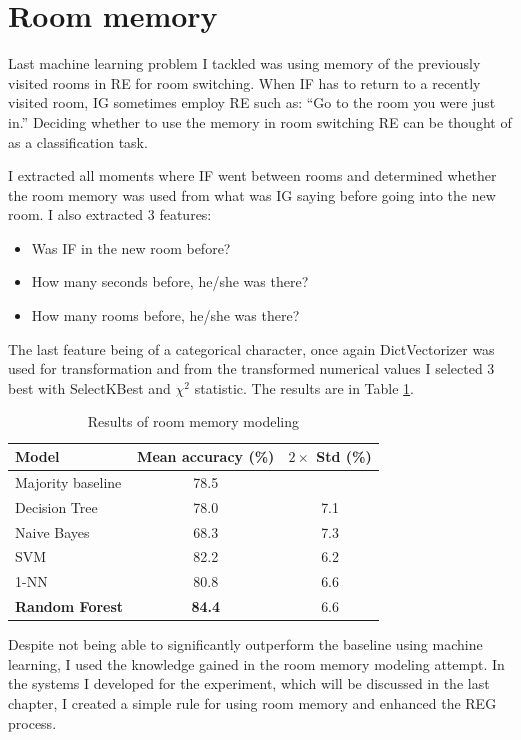 \section{Room memory}
Last machine learning problem I tackled was using memory of the previously visited rooms in RE for room switching. When IF has to return to a recently visited room, IG sometimes employ RE such as: ``Go to the room you were just in.'' Deciding whether to use the memory in room switching RE can be thought of as a classification task.

I extracted all moments where IF went between rooms and determined whether the room memory was used from what was IG saying before going into the new room. I also extracted 3 features:

\begin{itemize}
\item
Was IF in the new room before?
\item
How many seconds before, he/she was there?
\item
How many rooms before, he/she was there?
\end{itemize}

The last feature being of a categorical character, once again DictVectorizer was used for transformation and from the transformed numerical values I selected 3 best with SelectKBest and $\chi^2$ statistic. The results are in Table \ref{tab:history-ml}.

\begin{table}[!htbp]
 \centering
\begin{tabular}{lcc}
\toprule
Model    & Mean accuracy (\%) & $2\times$ Std (\%) \\
\midrule
 Majority baseline    & 78.5	& \\
\midrule
 Decision Tree 	& 78.0	& 7.1 	\\
 Naive Bayes  	& 68.3	& 7.3	\\
 SVM 			& 82.2	& 6.2 	\\
 1-NN			& 80.8	& 6.6 	\\
 \textbf{Random Forest}	& \textbf{84.4}	& 6.6	\\
\bottomrule
\end{tabular}
\caption{Results of room memory modeling}
\label{tab:history-ml}
\end{table}

Despite not being able to significantly outperform the baseline using machine learning, I used the knowledge gained in the room memory modeling attempt. In the systems I developed for the experiment, which will be discussed in the last chapter, I created a simple rule for using room memory and enhanced the REG process.

